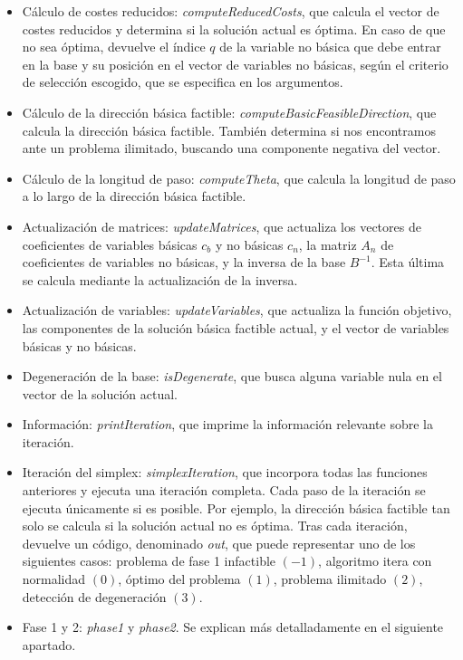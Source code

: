 \documentclass[12pt, titlepage]{article}
\begin{document}
\begin{itemize}
\item	Cálculo de costes reducidos: \textit{computeReducedCosts}, que calcula el vector de costes reducidos y determina si la solución actual es óptima. En caso de que no sea óptima, devuelve el índice $q$ de la variable no básica que debe entrar en la base y su posición en el vector de variables no básicas, según el criterio de selección escogido, que se especifica en los argumentos.
\item	Cálculo de la dirección básica factible: \textit{computeBasicFeasibleDirection}, que calcula la dirección básica factible. También determina si nos encontramos ante un problema ilimitado, buscando una componente negativa del vector.
\item	Cálculo de la longitud de paso: \textit{computeTheta}, que calcula la longitud de paso a lo largo de la dirección básica factible.
\item	Actualización de matrices:	\textit{updateMatrices}, que actualiza los vectores de coeficientes de variables básicas $c_b$ y no básicas $c_n$, la matriz $A_n$ de coeficientes de variables no básicas, y la inversa de la base $B^{-1}$. Esta última se calcula mediante la actualización de la inversa.
\item	Actualización de variables:	\textit{updateVariables}, que actualiza la función objetivo, las componentes de la solución básica factible actual, y el vector de variables básicas y no básicas.
\item	Degeneración de la base: \textit{isDegenerate}, que busca alguna variable nula en el vector de la solución actual.
\item	Información: \textit{printIteration}, que imprime la información relevante sobre la iteración.
\item	Iteración del simplex: \textit{simplexIteration}, que incorpora todas las funciones anteriores y ejecuta una iteración completa. Cada paso de la iteración se ejecuta únicamente si es posible. Por ejemplo, la dirección básica factible tan solo se calcula si la solución actual no es óptima. Tras cada iteración, devuelve un código, denominado \textit{out}, que puede representar uno de los siguientes casos: problema de fase 1 infactible $(-1)$, algoritmo itera con normalidad $(0)$, óptimo del problema $(1)$, problema ilimitado $(2)$, detección de degeneración $(3)$.
\item	Fase 1 y 2: \textit{phase1} y \textit{phase2}. Se explican más detalladamente en el siguiente apartado.
\end{itemize}
\end{document}
